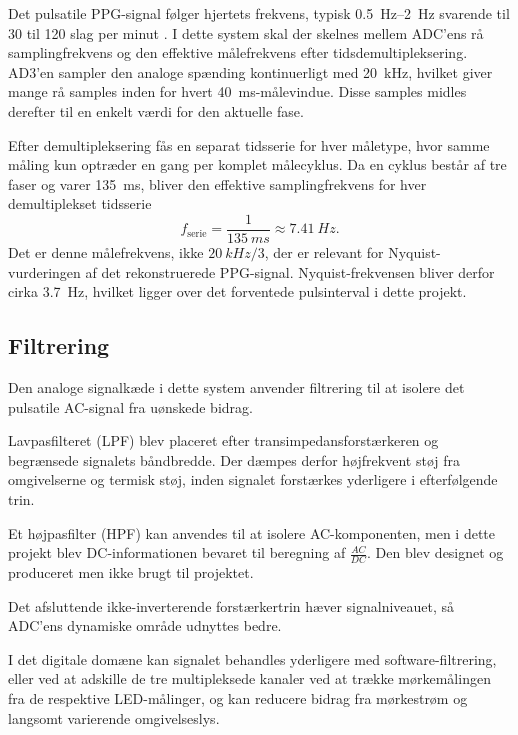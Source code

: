 Det pulsatile PPG-signal følger hjertets frekvens, typisk \SIrange{0.5}{2}{Hz} svarende til 30 til 120 slag per minut \cite{Allen2007,Ruberry2025}. I dette system skal der skelnes mellem ADC'ens rå samplingfrekvens og den effektive målefrekvens efter tidsdemultipleksering. AD3'en sampler den analoge spænding kontinuerligt med \SI{20}{kHz}, hvilket giver mange rå samples inden for hvert \SI{40}{ms}-målevindue. Disse samples midles derefter til en enkelt værdi for den aktuelle fase.

Efter demultipleksering fås en separat tidsserie for hver måletype, hvor samme måling kun optræder en gang per komplet målecyklus. Da en cyklus består af tre faser og varer \SI{135}{ms}, bliver den effektive samplingfrekvens for hver demultiplekset tidsserie
\begin{equation}
    f_{\mathrm{serie}} = \frac{1}{\SI{135}{ms}} \approx \SI{7.41}{Hz}.
\end{equation}
Det er denne målefrekvens, ikke $\SI{20}{kHz}/3$, der er relevant for Nyquist-vurderingen af det rekonstruerede PPG-signal. Nyquist-frekvensen bliver derfor cirka \SI{3.7}{Hz}, hvilket ligger over det forventede pulsinterval i dette projekt.

\subsection{Filtrering}
\label{sec:filtrering}

Den analoge signalkæde i dette system anvender filtrering til at isolere det pulsatile AC-signal fra uønskede bidrag. 

Lavpasfilteret (LPF) blev placeret efter transimpedansforstærkeren og begrænsede signalets båndbredde. Der dæmpes derfor højfrekvent støj fra omgivelserne og termisk støj, inden signalet forstærkes yderligere i efterfølgende trin.

Et højpasfilter (HPF) kan anvendes til at isolere AC-komponenten, men i dette projekt blev DC-informationen bevaret til beregning af $\frac{AC}{DC}$. Den blev designet og produceret men ikke brugt til projektet.

Det afsluttende ikke-inverterende forstærkertrin hæver signalniveauet, så ADC'ens dynamiske område udnyttes bedre.

I det digitale domæne kan signalet behandles yderligere med software-filtrering, eller ved at adskille de tre multipleksede kanaler ved at trække mørkemålingen fra de respektive LED-målinger, og kan reducere bidrag fra mørkestrøm og langsomt varierende omgivelseslys.

